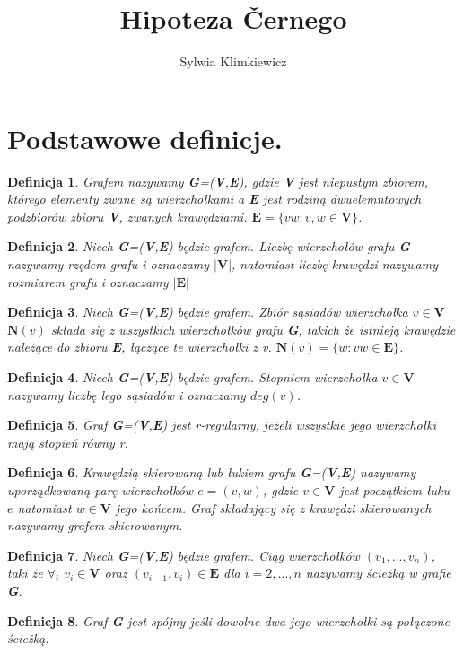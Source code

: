 \documentclass[12pt,a4paper]{article}
\newtheorem{df}{Definicja}[section]
\begin{document}
\title{Hipoteza \v Cernego}
\author{Sylwia Klimkiewicz}
\maketitle

\section{Podstawowe definicje.}
\begin{df} 
Grafem nazywamy \textbf{G}=(\textbf{V},\textbf{E}), gdzie \textbf{V} jest niepustym zbiorem, kt\'orego elementy zwane s\k{a} wierzcho{\l}kami a \textbf{E} jest rodzin\k{a} dwuelemntowych podzbior\'ow zbioru \textbf{V}, zwanych kraw\k{e}dziami.
$\textbf{E}=\{vw : v,w\in\textbf{V}\}$.
\end{df}
\begin{df} 
Niech \textbf{G}=(\textbf{V},\textbf{E}) b\k{e}dzie grafem. Liczb\k{e} wierzcho{\l}\'ow grafu \textbf{G} nazywamy rz\k{e}dem grafu i oznaczamy $|\textbf{V}|$, natomiast liczb\k{e} kraw\k{e}dzi nazywamy rozmiarem grafu i oznaczamy $|\textbf{E}|$
\end{df}
\begin{df} 
Niech \textbf{G}=(\textbf{V},\textbf{E}) b\k{e}dzie grafem. Zbi\'or s\k{a}siad\'ow wierzcho{\l}ka $v\in\textbf{V}$ $\textbf{N}(v)$ sk{\l}ada si\k{e} z wszystkich wierzcho{\l}k\'ow grafu \textbf{G}, takich \.ze istniej\k{a} kraw\k{e}dzie nale\.z\k{a}ce do zbioru \textbf{E}, {\l}\k{a}cz\k{a}ce te wierzcho{\l}ki z v. $\textbf{N}(v)=\{w : vw\in\textbf{E}\}$.
\end{df} 
\begin{df} 
Niech \textbf{G}=(\textbf{V},\textbf{E}) b\k{e}dzie grafem. Stopniem wierzcho{\l}ka $v\in\textbf{V}$ nazywamy liczb\k{e} lego s\k{a}siad\'ow i oznaczamy $deg(v)$.
\end{df}
\begin{df} 
Graf \textbf{G}=(\textbf{V},\textbf{E}) jest r-regularny, je\.zeli wszystkie jego wierzcho{\l}ki maj\k{a} stopie\'n r\'owny r.
\end{df} 
\begin{df} 
Kraw\k{e}dzi\k{a} skierowan\k{a} lub {\l}ukiem grafu \textbf{G}=(\textbf{V},\textbf{E}) nazywamy uporz\k{a}dkowan\k{a} par\k{e} wierzcho{\l}k\'ow $e=(v,w)$, gdzie $v\in\textbf{V}$ jest pocz\k{a}tkiem {\l}uku $e$ natomiast $w\in\textbf{V}$ jego ko\'ncem. Graf sk{\l}adaj\k{a}cy si\k{e} z kraw\k{e}dzi skierowanych nazywamy grafem skierowanym.
\end{df}

\begin{df} 
Niech \textbf{G}=(\textbf{V},\textbf{E}) b\k{e}dzie grafem. Ci\k{a}g wierzcho{\l}k\'ow $(v_{1},\ldots,v_{n})$, taki \.ze $\forall_{i}$ $v_{i}\in\textbf{V}$ oraz  $(v_{i-1},v_{i})\in\textbf{E}$ dla $i=2,\ldots,n$ nazywamy \'scie\.zk\k{a} w grafie \textbf{G}.
\end{df} 
\begin{df} 
Graf \textbf{G} jest sp\'ojny je\'sli dowolne dwa jego wierzcho{\l}ki s\k{a} po{\l}\k{a}czone \'scie\.zk\k{a}.
\end{df}
\end{document}
